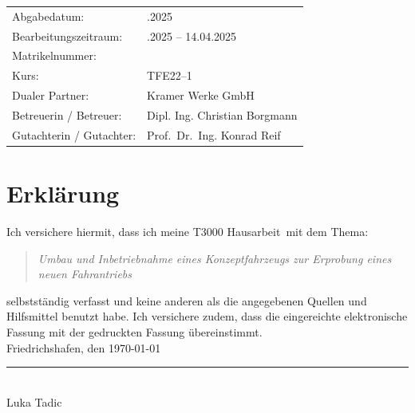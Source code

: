 \documentclass[a4paper, 12pt]{article} %
\newcommand{\titel}{Umbau und Inbetriebnahme eines Konzeptfahrzeugs zur Erprobung eines neuen Fahrantriebs}
\newcommand{\arbeit}{T3000 Hausarbeit}
\newcommand{\autor}{Luka Tadic}
\newcommand{\abgabe}{14.04.2025}
\newcommand{\bearbeitungszeitraum}{19.01.2025 – 14.04.2025}
\newcommand{\matrikelnr}{5726700}
\newcommand{\kurs}{TFE22–1} %
\newcommand{\firma}{Kramer Werke GmbH}
\newcommand{\betreuerfirma}{Dipl. Ing. Christian Borgmann}
\newcommand{\gutachterdhbw}{Prof.\ Dr.\ Ing. Konrad Reif}
\begin{document}
\begin{titlepage}
\begin{center}
\end{center}

\begin{center}
{\fontsize{12pt}{14pt}\selectfont
\begin{tabular}{ll}
Abgabedatum:                    & \quad \abgabe\\  
Bearbeitungszeitraum:           & \quad \bearbeitungszeitraum\\  
Matrikelnummer:                 & \quad \matrikelnr\\ 
Kurs:                           & \quad \kurs\\ 
Dualer Partner:                 & \quad \firma\\ %
Betreuerin / Betreuer:          & \quad \betreuerfirma\\  
Gutachterin / Gutachter:        & \quad \gutachterdhbw\\ [2ex]
\end{tabular}
}
\end{center}

\end{titlepage}

\clearpage

\pagestyle{scrheadings}  %
\hypersetup{pageanchor=true}



\section*{Erklärung}
\begin{spacing}{1.8}  %
    \fontsize{14pt}{14pt}\selectfont

Ich versichere hiermit, dass ich meine \arbeit\ mit dem Thema:

\begin{quote}
    \textit{\titel}
\end{quote}

selbstständig verfasst und keine anderen als die angegebenen Quellen und Hilfsmittel benutzt habe.  
Ich versichere zudem, dass die eingereichte elektronische Fassung mit der gedruckten Fassung übereinstimmt.\\[6ex]

Friedrichshafen, den \today \\[1ex]
\rule[-0.2cm]{5cm}{0.5pt} \\  
\autor\\[10ex]

\rmfamily

\end{spacing}
\clearpage
\end{document}
